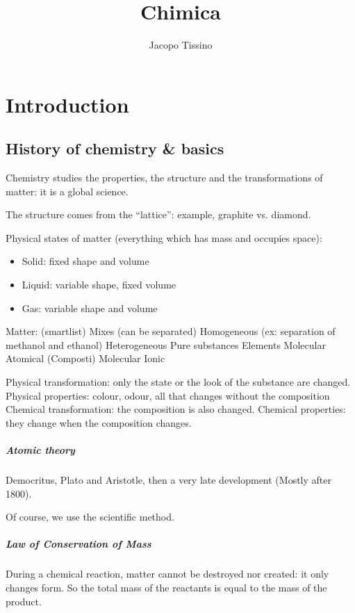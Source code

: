 \documentclass[12pt,a4paper]{report}
\author{Jacopo Tissino}
\title{Chimica}
\numberwithin{equation}{section}
\theoremstyle{definition}
\theoremstyle{remark}
\begin{document}
\maketitle

\chapter{Introduction}

\section{History of chemistry \& basics}

Chemistry studies the properties, the structure and the transformations of matter: it is a global science.

The structure comes from the ``lattice'': example, graphite vs. diamond.

Physical states of matter (everything which has mass and occupies space):

\begin{itemize}
\item Solid: fixed shape and volume
\item Liquid: variable shape, fixed volume
\item Gas: variable shape and volume
\end{itemize}

Matter: (smartlist)
    Mixes (can be separated)
        Homogeneous (ex: separation of methanol and ethanol)
        Heterogeneous
    Pure substances
        Elements
            Molecular
            Atomical
        (Composti)
            Molecular
            Ionic

Physical transformation: only the state or the look of the substance are changed.
Physical properties: colour, odour, all that changes without the composition
Chemical transformation: the composition is also changed.
Chemical properties: they change when the composition changes.

\paragraph{Atomic theory} Democritus, Plato and Aristotle, then a very late development (Mostly after 1800).

Of course, we use the scientific method.

\paragraph{Law of Conservation of Mass} During a chemical reaction, matter cannot be destroyed nor created: it only changes form. So the total mass of the reactants is equal to the mass of the product.
\end{document}
